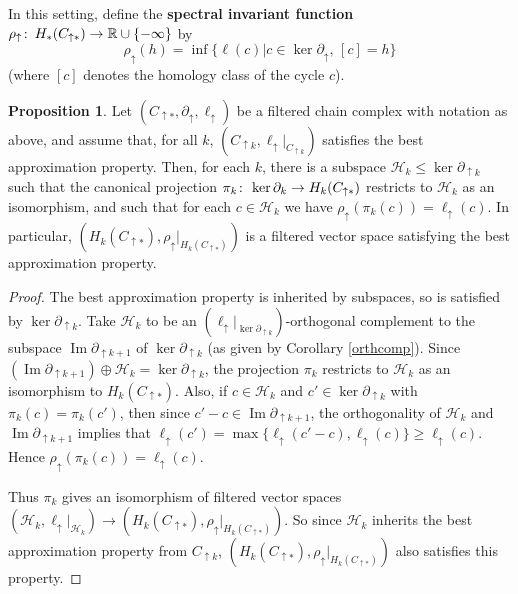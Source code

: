 \documentclass[11pt]{amsart}
\theoremstyle{definition}
\newtheorem{prop}[theorem]{Proposition}
\theoremstyle{remark}
\numberwithin{equation}{section}
\def\co{\colon\thinspace}
\def\R{\mathbb{R}}
\DeclareMathOperator{\Img}{Im}
\begin{document}
In this setting, define the \textbf{spectral invariant function} $\rho_{\uparrow}\co H_*(C_{\uparrow *})\to \R\cup\{-\infty\}$ by \begin{equation}\label{specfn} \rho_{\uparrow}(h)=\inf\{\ell(c)|c\in \ker\partial_{\uparrow},\,[c]=h\}\end{equation} (where $[c]$ denotes the homology class of the cycle $c$).

\begin{prop}\label{specproj} Let $(C_{\uparrow *},\partial_{\uparrow},\ell_{\uparrow})$ be a filtered chain complex with notation as above, and assume that, for all $k$, $(C_{\uparrow k},\ell_{\uparrow}|_{C_{\uparrow k}})$ satisfies the best approximation property.  Then, for each $k$, there is a subspace $\mathcal{H}_k\leq \ker\partial_{\uparrow k}$ such that the canonical projection $\pi_k\co \ker\partial_k\to H_k(C_{\uparrow *})$ restricts to $\mathcal{H}_k$ as an isomorphism, and such that for each $c\in\mathcal{H}_k$ we have $\rho_{\uparrow}(\pi_k(c))=\ell_{\uparrow}(c)$.  In particular, $(H_k(C_{\uparrow *}),\rho_{\uparrow}|_{H_k(C_{\uparrow *})})$ is a filtered vector space satisfying the best approximation property.
\end{prop}

\begin{proof}
	The best approximation property is inherited by subspaces, so is satisfied by $\ker\partial_{\uparrow k}$.  Take $\mathcal{H}_k$ to be an $(\ell_{\uparrow}|_{\ker\partial_{\uparrow k}})$-orthogonal complement to the subspace $\Img\partial_{\uparrow k+1}$ of $\ker\partial_{\uparrow k}$ (as given by Corollary \ref{orthcomp}).  Since $(\Img\partial_{\uparrow k+1})\oplus \mathcal{H}_k=\ker\partial_{\uparrow k}$, the projection $\pi_k$ restricts to $\mathcal{H}_k$ as an isomorphism to $H_k(C_{\uparrow *})$.  Also, if $c\in \mathcal{H}_k$ and $c'\in\ker\partial_{\uparrow k}$ with $\pi_k(c)=\pi_k(c')$, then since $c'-c\in\Img\partial_{\uparrow k+1}$, the orthogonality of $\mathcal{H}_k$ and $\Img\partial_{\uparrow k+1}$ implies that $\ell_{\uparrow}(c')=\max\{\ell_{\uparrow}(c'-c),\ell_{\uparrow}(c)\}\geq \ell_{\uparrow}(c)$. Hence $\rho_{\uparrow}(\pi_k(c))=\ell_{\uparrow}(c)$.
	
	Thus $\pi_k$ gives an isomorphism of filtered vector spaces $(\mathcal{H}_k,\ell_{\uparrow}|_{\mathcal{H}_k})\to (H_k(C_{\uparrow *}),\rho_{\uparrow}|_{H_k(C_{\uparrow *})})$.  So since $\mathcal{H}_k$ inherits the best approximation property from $C_{\uparrow k}$, $(H_k(C_{\uparrow *}),\rho_{\uparrow}|_{H_k(C_{\uparrow *})})$ also satisfies this property.
\end{proof}
\end{document}

